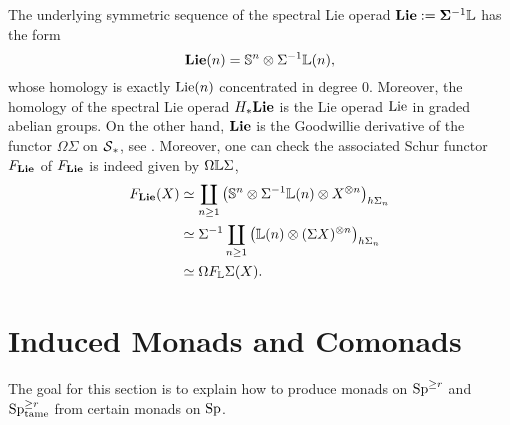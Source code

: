 \begin{remark}
\label{Remark on shifted Lie operads}
The underlying symmetric sequence of the spectral Lie operad $\mathbf{Lie}:= \mathbf{\Sigma}^{-1}{\mathbb{L}}$
	has the form 	
	$$
	\mathbf{Lie}(n)= {\mathbb{S}}^{n} \otimes \Sigma^{-1} {\mathbb{L}}(n),
	$$
	whose homology is exactly $\operatorname{Lie}(n)$ concentrated in degree $0$.
	Moreover, the homology of the spectral Lie operad $H_{*}\mathbf{Lie}$ is the Lie operad $\operatorname{Lie}$ in graded abelian groups.
	On the other hand, $\mathbf{Lie}$ is the Goodwillie derivative of the functor $\Omega\Sigma$ on $\operatorname{\mathcal{S}}_*$, see \cite[Section 8]{GoodwillieIII}.
	Moreover, one can check the associated Schur functor $F_{\mathbf{Lie}}$ of $F_{\mathbf{Lie}}$ is indeed given by $\Omega{\mathbb{L}} \Sigma$,
	\begin{align*}
		F_{\mathbf{Lie}}(X) &\simeq \coprod_{n\geq 1}
		\big(
		{\mathbb{S}}^{n} \otimes \Sigma^{-1}{\mathbb{L}}(n) 
		\otimes X^{\otimes n}
		\big)_{h\Sigma_n}\\
		& \simeq 
		\Sigma^{-1}
		\coprod_{n\geq 1}
		\big(
		{\mathbb{L}}(n) 
		\otimes (\Sigma X)^{\otimes n}
		\big)_{h\Sigma_n}\\
		& \simeq 
		\Omega F_{{\mathbb{L}}}\Sigma(X).
	\end{align*}	
\end{remark}



\section{Induced Monads and Comonads}
\label{Section: Induced Monads}
The goal for this section is to explain how to produce monads on $\operatorname{Sp}^{\geq r}$ and $\operatorname{Sp}^{\geq r}_{\operatorname{\operatorname{tame}}}$ from certain monads on $\operatorname{Sp}$.

